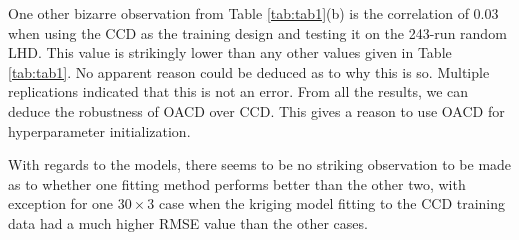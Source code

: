 \documentclass [PhD] {package/uclathes}
\begin{document}
One other bizarre observation from Table \ref{tab:tab1}(b) is the correlation of $0.03$ when using the CCD as the training design and testing it on the 243-run random LHD. This value is strikingly lower than any other values given in Table \ref{tab:tab1}. No apparent reason could be deduced as to why this is so. Multiple replications indicated that this is not an error.  From all the results, we can deduce the robustness of OACD over CCD. This gives a reason to use OACD for hyperparameter initialization.








With regards to the models, there seems to be no striking observation to be made as to whether one fitting method performs better than the other two, with  exception for one $30 \times 3$ case when the kriging model fitting to the CCD training data had a much higher RMSE value than the other cases.
\end{document}
